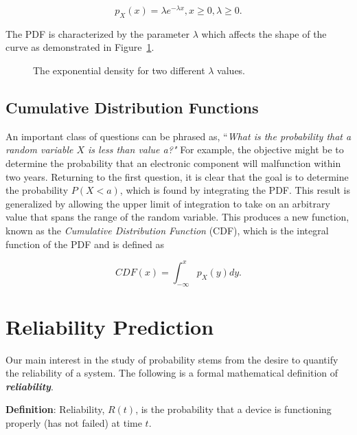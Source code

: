 \begin{equation}
\label{equ:exponentialDensity}
p_X(x) = \lambda e^{-\lambda x} , x \geq 0, \lambda \geq 0.
\end{equation}

The PDF is characterized by the parameter $\lambda$ which affects the
shape of the curve as demonstrated in 
Figure~\ref{figure:exponentialDensityFunction}.


\begin{figure}
\caption{The exponential density for two different $\lambda$ values.}
\label{figure:exponentialDensityFunction}
\end{figure}


\subsection{Cumulative Distribution Functions}
\label{cumulative-distribution-functions}

An important class of questions can be phrased as, ``\emph{What is the
probability that a random variable $X$ is less than value a?"} For
example, the objective might be to determine the probability that an
electronic component will malfunction within two years. Returning to the
first question, it is clear that the goal is to determine the
probability $P(X<a)$, which is found by
integrating the PDF. This result is generalized by allowing the upper
limit of integration to take on an arbitrary value that spans the range
of the random variable. This produces a new function, known as the
\emph{Cumulative Distribution Function} (CDF), which is the integral
function of the PDF and is defined as

\begin{equation}
\label{equ:exponentialDensity}
CDF(x) = \int^x_{-\infty} p_X(y)dy.
\end{equation}

\section{Reliability Prediction}
\label{section:reliability-prediction}

Our main interest in the study of probability stems from the desire to
quantify the reliability of a system. The following is a formal
mathematical definition of \emph{\textbf{reliability}}.

\begin{itquote}
\textbf{Definition}: Reliability, $R(t)$, is the probability that a
device is functioning properly (has not failed) at time $t$.
\end{itquote}

